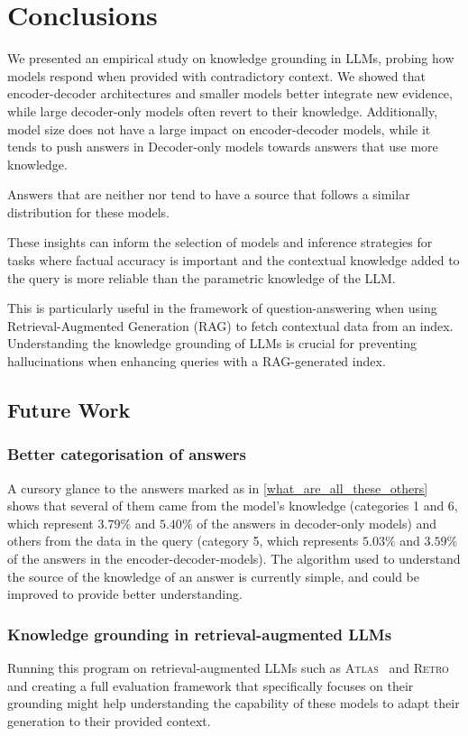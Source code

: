 \section{Conclusions}

We presented an empirical study on knowledge grounding in LLMs, probing how models respond when provided with contradictory context.
We showed that encoder-decoder architectures and smaller models better integrate new evidence, while large decoder-only models often revert to their \Parametric{} knowledge.  Additionally, model size does not have a large impact on encoder-decoder models, while it tends to push answers in Decoder-only models towards answers that use more \Parametric{} knowledge.

Answers that are neither \Parametric{} nor \Contextual{} tend to have a source that follows a similar distribution for these models.

These insights can inform the selection of models and inference strategies for tasks where factual accuracy is important and the contextual knowledge added to the query is more reliable than the parametric knowledge of the LLM.

This is particularly useful in the framework of question-answering when using Retrieval-Augmented Generation (RAG) to fetch contextual data from an index.
Understanding the knowledge grounding of LLMs is crucial for preventing hallucinations when enhancing queries with a RAG-generated index.

\subsection{Future Work}

\subsubsection{Better categorisation of \Other{} answers}
A cursory glance to the answers marked as \Other{} in \cref{what_are_all_these_others} shows that several of them came from the model's \Parametric{} knowledge (categories 1 and 6, which represent $3.79\%$ and $5.40\%$ of the answers in decoder-only models) and others from the \Contextual{} data in the query (category 5, which represents $5.03\%$ and $3.59\%$ of the answers in the encoder-decoder-models).
The algorithm used to understand the source of the knowledge of an answer is currently simple, and could be improved to provide better understanding.

\subsubsection{Knowledge grounding in retrieval-augmented LLMs}
Running this program on retrieval-augmented LLMs such as \textsc{Atlas}~\cite{atlas_foundational} and \textsc{Retro}~\cite{retro} and creating a full evaluation framework that specifically focuses on their grounding might help understanding the capability of these models to adapt their generation to their provided context.

